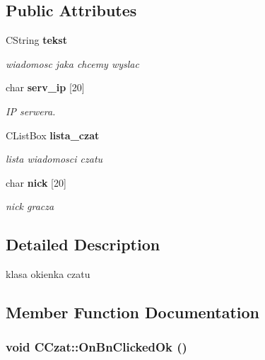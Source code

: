 \subsection*{Public Attributes}
\begin{CompactItemize}
\item 
CString {\bf tekst}\label{class_c_czat_8594be8b87f722c3147916de26dbe7ec}

\begin{CompactList}\small\item\em wiadomosc jaka chcemy wyslac \item\end{CompactList}\item 
char {\bf serv\_\-ip} [20]\label{class_c_czat_f9cb674fce244307725de3607208ba4e}

\begin{CompactList}\small\item\em IP serwera. \item\end{CompactList}\item 
CListBox {\bf lista\_\-czat}\label{class_c_czat_bb5beb3b3081e32dc9b18bd103f0c2b8}

\begin{CompactList}\small\item\em lista wiadomosci czatu \item\end{CompactList}\item 
char {\bf nick} [20]\label{class_c_czat_8d3f862b86c231a8b8d64ca4b67e0244}

\begin{CompactList}\small\item\em nick gracza \item\end{CompactList}\end{CompactItemize}


\subsection{Detailed Description}
klasa okienka czatu 



\subsection{Member Function Documentation}
\subsubsection{\setlength{\rightskip}{0pt plus 5cm}void CCzat::OnBnClickedOk ()}\label{class_c_czat_7032c63d6d57d44641b4613a05fe5a2c}


